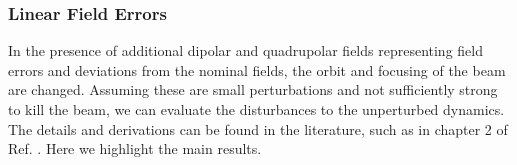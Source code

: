     \subsubsection{Linear Field Errors}

    In the presence of additional dipolar and quadrupolar fields representing field errors and deviations from the nominal fields, the orbit and focusing of the beam are changed. Assuming these are small perturbations and not sufficiently strong to kill the beam, we can evaluate the disturbances to the unperturbed dynamics. The details and derivations can be found in the literature, such as in chapter 2 of Ref. \cite{lee_accelerator_2004}. Here we highlight the main results.

